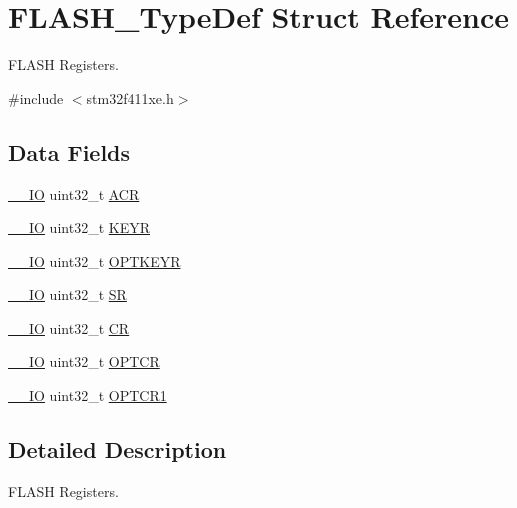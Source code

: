 \hypertarget{struct_f_l_a_s_h___type_def}{}\section{F\+L\+A\+S\+H\+\_\+\+Type\+Def Struct Reference}
\label{struct_f_l_a_s_h___type_def}


F\+L\+A\+SH Registers.  




{\ttfamily \#include $<$stm32f411xe.\+h$>$}

\subsection*{Data Fields}
\begin{DoxyCompactItemize}
\item 
\hyperlink{core__sc300_8h_aec43007d9998a0a0e01faede4133d6be}{\+\_\+\+\_\+\+IO} uint32\+\_\+t \hyperlink{struct_f_l_a_s_h___type_def_aaf432a8a8948613f4f66fcace5d2e5fe}{A\+CR}
\item 
\hyperlink{core__sc300_8h_aec43007d9998a0a0e01faede4133d6be}{\+\_\+\+\_\+\+IO} uint32\+\_\+t \hyperlink{struct_f_l_a_s_h___type_def_a802e9a26a89b44decd2d32d97f729dd3}{K\+E\+YR}
\item 
\hyperlink{core__sc300_8h_aec43007d9998a0a0e01faede4133d6be}{\+\_\+\+\_\+\+IO} uint32\+\_\+t \hyperlink{struct_f_l_a_s_h___type_def_a793cd13a4636c9785fdb99316f7fd7ab}{O\+P\+T\+K\+E\+YR}
\item 
\hyperlink{core__sc300_8h_aec43007d9998a0a0e01faede4133d6be}{\+\_\+\+\_\+\+IO} uint32\+\_\+t \hyperlink{struct_f_l_a_s_h___type_def_a52c4943c64904227a559bf6f14ce4de6}{SR}
\item 
\hyperlink{core__sc300_8h_aec43007d9998a0a0e01faede4133d6be}{\+\_\+\+\_\+\+IO} uint32\+\_\+t \hyperlink{struct_f_l_a_s_h___type_def_a7919306d0e032a855200420a57f884d7}{CR}
\item 
\hyperlink{core__sc300_8h_aec43007d9998a0a0e01faede4133d6be}{\+\_\+\+\_\+\+IO} uint32\+\_\+t \hyperlink{struct_f_l_a_s_h___type_def_a54026c3b5bc2059f1b187acb6c4817ac}{O\+P\+T\+CR}
\item 
\hyperlink{core__sc300_8h_aec43007d9998a0a0e01faede4133d6be}{\+\_\+\+\_\+\+IO} uint32\+\_\+t \hyperlink{struct_f_l_a_s_h___type_def_a180354afdf5ff27d04befd794c46156d}{O\+P\+T\+C\+R1}
\end{DoxyCompactItemize}


\subsection{Detailed Description}
F\+L\+A\+SH Registers. 

